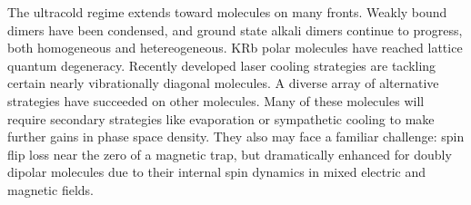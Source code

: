 \documentclass[%
 reprint,
 amsmath,amssymb,
 aps,
prl,
]{revtex4-1}
\newcommand{\s}{{\nobreak\hspace{.2em}}}
\begin{document}
The ultracold regime extends toward molecules on many fronts\s\cite{Carr2009}. 
Weakly bound dimers have been condensed\s\cite{Greiner2003,Zwierlein2003,Jochim2003}, and ground state alkali dimers continue to progress, both homogeneous\s\cite{Lang2008,Danzl2010} and hetereogeneous\s\cite{Takekoshi2014, Park2015,Guo2016,Liu2017,Rvachov2017}. 
KRb polar molecules have reached lattice quantum degeneracy\s\cite{Moses2015}.
Recently developed laser cooling strategies are tackling certain nearly vibrationally diagonal molecules\s\cite{Stuhl2008,Hummon2013, Barry2014, Zhelyazkova2014, Hemmerling2016,Truppe2017}. 
A diverse array of alternative strategies have succeeded on other molecules\s\cite{Weinstein1998, Bethlem1999, Bochinski2003, Narevicius2008, Wiederkehr2012, Prehn2016, Liu2017a}. 
Many of these molecules will require secondary strategies like evaporation or sympathetic cooling to make further gains in phase space density\s\cite{Parazzoli2011, Stuhl2012evap, Quemener2016}. 
They also may face a familiar challenge: spin flip loss near the zero of a magnetic trap, but dramatically enhanced for doubly dipolar molecules due to their internal spin dynamics in mixed electric and magnetic fields. 
\end{document}
